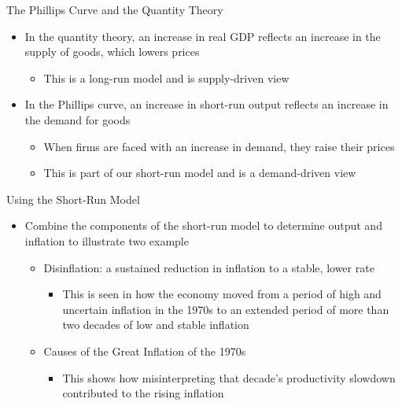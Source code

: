 \documentclass[aspectratio=1610]{beamer}
\begin{document}
\begin{frame}[wide]{The Phillips Curve and the Quantity Theory}
	\begin{itemize}
		\item In the quantity theory, an increase in real GDP reflects an increase in the supply of goods, which lowers prices
		\vspace{2mm}
		\begin{itemize}
			\item This is a long-run model and is supply-driven view
		\end{itemize}
		\vspace{4mm}
		\item In the Phillips curve, an increase in short-run output reflects an increase in the demand for goods
		\vspace{2mm}
		\begin{itemize}
			\item When firms are faced with an increase in demand, they raise their prices
			\item This is part of our short-run model and is a demand-driven view
		\end{itemize}
	\end{itemize}
\end{frame}

\begin{frame}[wide]{Using the Short-Run Model}
	\begin{itemize}
		\item Combine the components of the short-run model to determine output and inflation to illustrate two example
		\vspace{2mm}
		\begin{itemize}
			\item Disinflation: a sustained reduction in inflation to a stable, lower rate
			\vspace{2mm}
			\begin{itemize}
				\item This is seen in how the economy moved from a period of high and uncertain inflation in the 1970s to an extended period of more than two decades of low and stable inflation
			\end{itemize}
			\vspace{2mm}
			\item Causes of the Great Inflation of the 1970s 
			\vspace{2mm}
			\begin{itemize}
				\item This shows how misinterpreting that decade’s productivity slowdown contributed to the rising inflation
			\end{itemize}
		\end{itemize}
	\end{itemize}
\end{frame}
\end{document}
